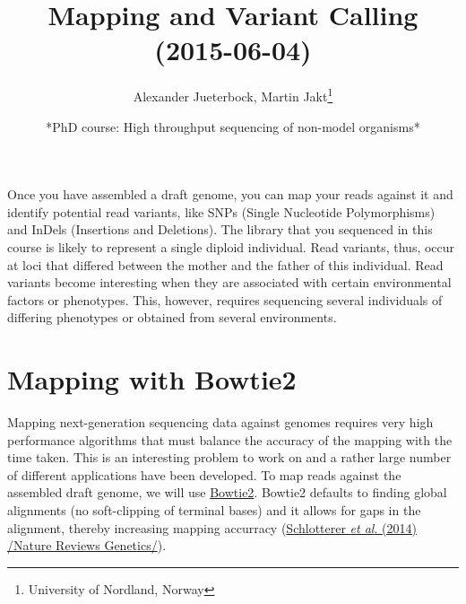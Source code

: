 \documentclass[11pt]{article}
\title{\textbf{Mapping and Variant Calling} (2015-06-04)}
\author{Alexander Jueterbock, Martin Jakt\thanks{University of Nordland, Norway}}
\date{*PhD course: High throughput sequencing of non-model organisms*}
\begin{document}
\maketitle

\setcounter{tocdepth}{3}
\tableofcontents
\vspace*{1cm}












                                                



                                        

                                











Once you have assembled a draft genome, you can map your reads against it
and identify potential read variants, like SNPs (Single Nucleotide
Polymorphisms) and InDels (Insertions and Deletions). The library that
you sequenced in this course is likely to represent a single diploid
individual. Read variants, thus, occur at loci that differed between
the mother and the father of this individual. Read variants become
interesting when they are associated with certain environmental
factors or phenotypes. This, however, requires sequencing several
individuals of differing phenotypes or obtained from several  
environments.

\section{Mapping with Bowtie2}
\label{sec-1}

Mapping next-generation sequencing data against genomes requires very high
performance algorithms that must balance the accuracy of the mapping with the
time taken. This is an interesting problem to work on and a rather large
number of different applications have been developed. 
To map reads against the assembled draft genome, we will use \href{http://bowtie-bio.sourceforge.net/bowtie2/index.shtml}{Bowtie2}.
Bowtie2 defaults to finding global alignments (no soft-clipping of
terminal bases) and it allows for gaps in the alignment, thereby
increasing mapping accurracy (\href{http://www.nature.com/nrg/journal/v15/n11/full/nrg3803.html}{Schlotterer \emph{et al}. (2014) /Nature Reviews Genetics/}). 
\end{document}
